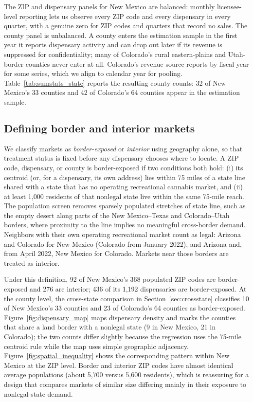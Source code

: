 The ZIP and dispensary panels for New Mexico are balanced: monthly
licensee-level reporting lets us observe every ZIP code and every dispensary in
every quarter, with a genuine zero for ZIP codes and quarters that record no
sales. The county panel is unbalanced. A county enters the estimation sample in
the first year it reports dispensary activity and can drop out later if its
revenue is suppressed for confidentiality; many of Colorado's rural
eastern-plains and Utah-border counties never enter at all. Colorado's revenue
source reports by fiscal year for some series, which we align to calendar year
for pooling. Table~\ref{tab:sumstats_state} reports the resulting county counts:
32 of New Mexico's 33 counties and 42 of Colorado's 64 counties appear in the
estimation sample.



\subsection{Defining border and interior markets}

We classify markets as \emph{border-exposed} or \emph{interior} using geography
alone, so that treatment status is fixed before any dispensary chooses where to
locate. A ZIP code, dispensary, or county is border-exposed if two conditions
both hold: (i) its centroid (or, for a dispensary, its own address) lies within
75 miles of a state line shared with a state that has no operating recreational
cannabis market, and (ii) at least 1,000 residents of that nonlegal state live
within the same 75-mile reach. The population screen removes sparsely populated
stretches of state line, such as the empty desert along parts of the
New Mexico--Texas and Colorado--Utah borders, where proximity to the line
implies no meaningful cross-border demand. Neighbors with their own operating
recreational market count as legal: Arizona and Colorado for New Mexico
(Colorado from January 2022), and Arizona and, from April 2022, New Mexico for
Colorado. Markets near those borders are treated as interior.

Under this definition, 92 of New Mexico's 368 populated ZIP codes are
border-exposed and 276 are interior; 436 of its 1,192 dispensaries are
border-exposed. At the county level, the cross-state comparison in
Section~\ref{sec:crossstate} classifies 10 of New Mexico's 33 counties and 23 of
Colorado's 64 counties as border-exposed. Figure~\ref{fig:dispensary_map} maps
dispensary density and marks the counties that share a land border with a
nonlegal state (9 in New Mexico, 21 in Colorado); the two counts differ slightly
because the regression uses the 75-mile centroid rule while the map uses simple
geographic adjacency. Figure~\ref{fig:spatial_inequality} shows the
corresponding pattern within New Mexico at the ZIP level. Border and interior
ZIP codes have almost identical average populations (about 5,700 versus 5,600
residents), which is reassuring for a design that compares markets of similar
size differing mainly in their exposure to nonlegal-state demand.

